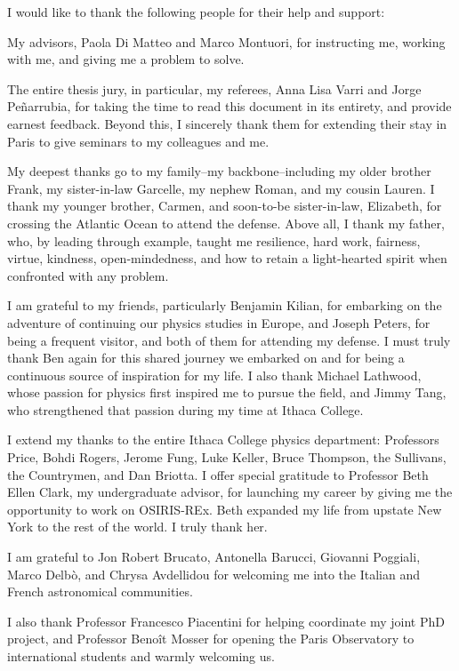 I would like to thank the following people for their help and support:

My advisors, Paola Di Matteo and Marco Montuori, for instructing me, working with me, and giving me a problem to solve. 

The entire thesis jury, in particular, my referees, Anna Lisa Varri and Jorge Peñarrubia, for taking the time to read this document in its entirety, and provide earnest feedback. Beyond this, I sincerely thank them for extending their stay in Paris to give seminars to my colleagues and me.  

My deepest thanks go to my family--my backbone--including my older brother Frank, my sister-in-law Garcelle, my nephew Roman, and my cousin Lauren. I thank my younger brother, Carmen, and soon-to-be sister-in-law, Elizabeth, for crossing the Atlantic Ocean to attend the defense. Above all, I thank my father, who, by leading through example, taught me resilience, hard work, fairness, virtue, kindness, open-mindedness, and how to retain a light-hearted spirit when confronted with any problem.

I am grateful to my friends, particularly Benjamin Kilian, for embarking on the adventure of continuing our physics studies in Europe, and Joseph Peters, for being a frequent visitor, and both of them for attending my defense. I must truly thank Ben again for this shared journey we embarked on and for being a continuous source of inspiration for my life. I also thank Michael Lathwood, whose passion for physics first inspired me to pursue the field, and Jimmy Tang, who strengthened that passion during my time at Ithaca College.

I extend my thanks to the entire Ithaca College physics department: Professors Price, Bohdi Rogers, Jerome Fung, Luke Keller, Bruce Thompson, the Sullivans, the Countrymen, and Dan Briotta. I offer special gratitude to Professor Beth Ellen Clark, my undergraduate advisor, for launching my career by giving me the opportunity to work on OSIRIS-REx. Beth expanded my life from upstate New York to the rest of the world. I truly thank her.

I am grateful to Jon Robert Brucato, Antonella Barucci, Giovanni Poggiali, Marco Delbò, and Chrysa Avdellidou for welcoming me into the Italian and French astronomical communities. 

I also thank Professor Francesco Piacentini for helping coordinate my joint PhD project, and Professor Benoît Mosser for opening the Paris Observatory to international students and warmly welcoming us.

